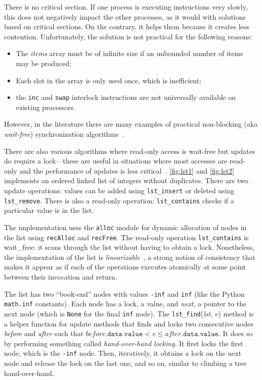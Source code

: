 \documentclass{report}
\begin{document}
There is no critical section.  If one process is executing instructions
very slowly, this does not negatively impact the other processes, as it
would with solutions based on critical sections.
On the contrary, it helps them because it creates less contention.
Unfortunately, the solution is not practical for the following reasons:
\begin{itemize}
\item The \textit{items} array must be of infinite size if an unbounded number
of items may be produced;
\item Each slot in the array is only used once, which is inefficient;
\item the \texttt{inc} and \texttt{swap} interlock instructions are not
universally available on existing processors.
\end{itemize}
However, in the literature there are many examples of practical
non-blocking (aka \emph{wait-free})
%
synchronization algorithms~\cite{}.

There are also various algorithms where read-only access is wait-free
but updates do require a lock---these are useful in situations where
most accesses are read-only and the performance of updates is less
critical~\cite{}.
\autoref{fig:lst1} and \autoref{fig:lst2} implements an ordered linked
list of integers without duplicates.
There are two update operations:
values can be added using \texttt{lst\_insert} or deleted using
\texttt{lst\_remove}.
There is also a read-only operation: \texttt{lst\_contains} checks if
a particular value is in the list.

%

The implementation uses the \texttt{alloc} module for dynamic allocation
%
of nodes in the list using \texttt{recAlloc} and \texttt{recFree}.
The read-only operation \texttt{lst\_contains} is wait\_free: it scans
through the list without having to obtain a lock.
Nonetheless, the implementation of the list is
\emph{linearizable}~\cite{HW90},
%
a strong notion of consistency that
makes it appear as if each of the operations executes atomically at
some point between their invocation and return.

The list has two ``book-end'' nodes with values \texttt{-inf} and
\texttt{inf} (like the Python \texttt{math.inf} constants).
Each node has a lock, a value, and \textit{next}, a pointer to the next node
(which is \texttt{None} for the final \texttt{inf} node).
The \texttt{lst\_find}(\textit{lst}, $v$) method is a helper function for update
methods that
finds and locks two consecutive nodes \textit{before} and \textit{after}
such that $\mathit{before}.\mathtt{data.value} < v \le \mathit{after}.\mathtt{data.value}$.
It does so by performing something called \emph{hand-over-hand locking}.
%
It first locks the first node, which is the \texttt{-inf} node.
Then, iteratively, it obtains a lock on the next node and release the
lock on the last one, and so on, similar to climbing a tree
hand-over-hand.
\end{document}
